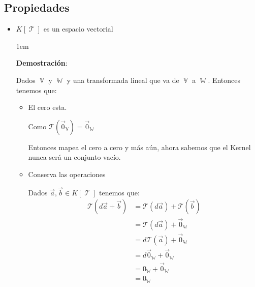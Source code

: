 \documentclass[12pt, fleqn]{report}                             %
\newenvironment{SmallIndentation}[1][0.75em]                    %
        {\begin{adjustwidth}{#1}{}\begin{footnotesize}}             %
        {\end{footnotesize}\end{adjustwidth}}                       %
\theoremstyle{break}                                            %
\DeclareMathOperator \VectorSet    {\mathbb{V}}                 %
\DeclareMathOperator \SubVectorSet {\mathbb{W}}                 %
\DeclareMathOperator \LinealTransformation {\mathcal{T}}        %
\newcommand{\Wrap}[1]    {\left( #1 \right)}                    %
\newcommand{\FnLinTrans}[1]{\mathcal{T}\Wrap{#1}}               %
\begin{document}
            \subsection{Propiedades}

                \begin{itemize}
                    
                    \item $K[\LinealTransformation]$ es un espacio vectorial

                        \begin{SmallIndentation}[1em]
                            \textbf{Demostración}:
                            
                            Dados $\VectorSet$ y $\SubVectorSet$ y una transformada lineal
                            que va de $\VectorSet$ a $\SubVectorSet$.
                            Entonces tenemos que:

                            \begin{itemize}
                                \item 
                                    El cero esta.

                                    Como $\FnLinTrans{\vec 0_{\VectorSet}} = \vec 0_{\SubVectorSet}$

                                    Entonces mapea el cero a cero y más aún, ahora sabemos que el Kernel nunca
                                    será un conjunto vacío.

                                \item 
                                    Conserva las operaciones

                                    Dados $\vec a, \vec b \in K[\LinealTransformation]$ tenemos que:
                                    \begin{align*}
                                        \FnLinTrans{d\vec a + \vec b}
                                            &= \FnLinTrans{d\vec a} + \FnLinTrans{\vec b}       \\
                                            &= \FnLinTrans{d\vec a} + \vec 0_{\SubVectorSet}    \\
                                            &= d\FnLinTrans{\vec a} + \vec 0_{\SubVectorSet}    \\
                                            &= d\vec 0_{\SubVectorSet} + \vec 0_{\SubVectorSet} \\
                                            &= 0_{\SubVectorSet} + \vec 0_{\SubVectorSet}       \\
                                            &= 0_{\SubVectorSet}
                                    \end{align*}


\end{itemize}
\end{SmallIndentation}
\end{itemize}
\end{document}
